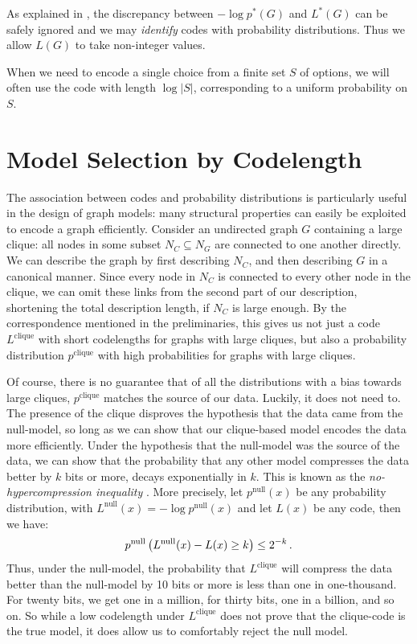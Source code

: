 As explained in \cite[page 96]{grunwald2007minimum}, the discrepancy between $-\log p^*(G)$ and $L^*(G)$ can be safely ignored and we may \emph{identify} codes with probability distributions. Thus we allow $L(G)$ to take non-integer values. 

When we need to encode a single choice from a finite set $S$ of options, we will often use the code with length $\log |S|$, corresponding to a uniform probability on $S$. 

\section*{Model Selection by Codelength}

\label{section:model-selection}

The association between codes and probability distributions is particularly useful in the design of graph models: many structural properties can easily be exploited to encode a graph efficiently. Consider an undirected graph $G$ containing a large clique: all nodes in some subset $N_C \subseteq N_G$ are connected to one another directly. We can describe the graph by first describing $N_C$, and then describing $G$ in a canonical manner. Since every node in $N_C$ is connected to every other node in the clique, we can omit these links from the second part of our description, shortening the total description length, if $N_C$ is large enough. By the correspondence mentioned in the preliminaries, this gives us not just a code $L^\text{clique}$ with short codelengths for graphs with large cliques, but also a probability distribution $p^\text{clique}$ with high probabilities for graphs with large cliques. 

Of course, there is no guarantee that of all the distributions with a bias towards large cliques, $p^\text{clique}$ matches the source of our data. Luckily, it does not need to. The presence of the clique disproves the hypothesis that the data came from the null-model, so long as we can show that our clique-based model encodes the data more efficiently. Under the hypothesis that the null-model was the source of the data, we can show that the probability that any other model compresses the data better by $k$ bits or more, decays exponentially in $k$. This is known as  the \emph{no-hypercompression inequality} \cite[p103]{grunwald2007minimum}. More precisely, let $p^\text{null}(x)$ be any probability distribution, with $L^\text{null}(x) = - \log p^\text{null}(x)$ and let $L(x)$ be any code, then we have:
\[
p^\text{null}\left(L^\text{null}(x) - L(x) \geq k\right) \leq 2^{-k} \,\text{.}
\]
Thus, under the null-model, the probability that $L^\text{clique}$ will compress the data better than the null-model by 10 bits or more is less than one in one-thousand. For twenty bits, we get one in a million, for thirty bits, one in a billion, and so on. So while a low codelength under $L^\text{clique}$ does not prove that the clique-code is the true model, it does allow us to comfortably reject the null model. 

